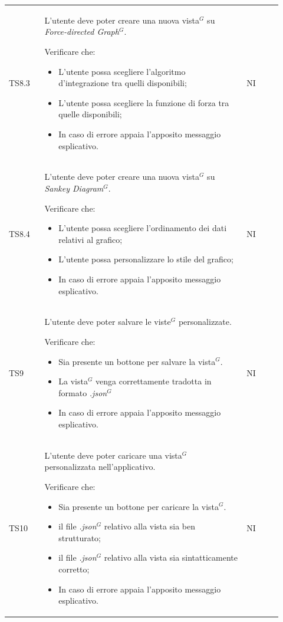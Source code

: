 \begin{longtable}{p{0.12\linewidth}p{0.68\linewidth}p{0.12\linewidth}}
    \rowcolor[RGB]{233, 245, 206}
    TS8.3 &
    L'utente deve poter creare una nuova vista$^{G}$ su \textit{Force-directed Graph}$^{G}$. \par
    Verificare che:
    \begin{itemize}
        \item L'utente possa scegliere l'algoritmo d'integrazione tra quelli disponibili;
        \item L'utente possa scegliere la funzione di forza tra quelle disponibili;
        \item In caso di errore appaia l’apposito messaggio esplicativo.
    \end{itemize}&
    NI \\

    \rowcolor[RGB]{216, 235, 171}
    TS8.4 &
    L'utente deve poter creare una nuova vista$^{G}$ su \textit{Sankey Diagram}$^{G}$. \par
    Verificare che:
    \begin{itemize}
        \item L'utente possa scegliere l'ordinamento dei dati relativi al grafico;
        \item L'utente possa personalizzare lo stile del grafico;
        \item In caso di errore appaia l'apposito messaggio esplicativo.
    \end{itemize}&
    NI \\

    \rowcolor[RGB]{233, 245, 206}
    TS9 &
    L'utente deve poter salvare le viste$^{G}$ personalizzate. \par
    Verificare che:
    \begin{itemize}
        \item Sia presente un bottone per salvare la vista$^{G}$.
        \item La vista$^{G}$ venga correttamente tradotta in formato \textit{.json}$^{G}$
        \item In caso di errore appaia l'apposito messaggio esplicativo.
    \end{itemize}&
    NI \\

    \rowcolor[RGB]{216, 235, 171}
    TS10 &
    L'utente deve poter caricare una vista$^{G}$ personalizzata nell'applicativo. \par
    Verificare che:
    \begin{itemize}
        \item Sia presente un bottone per caricare la vista$^{G}$.
        \item il file \textit{.json}$^{G}$ relativo alla vista sia ben strutturato;
        \item il file \textit{.json}$^{G}$ relativo alla vista sia sintatticamente corretto;
        \item In caso di errore appaia l'apposito messaggio esplicativo.
    \end{itemize}&
    NI \\


\end{longtable}
